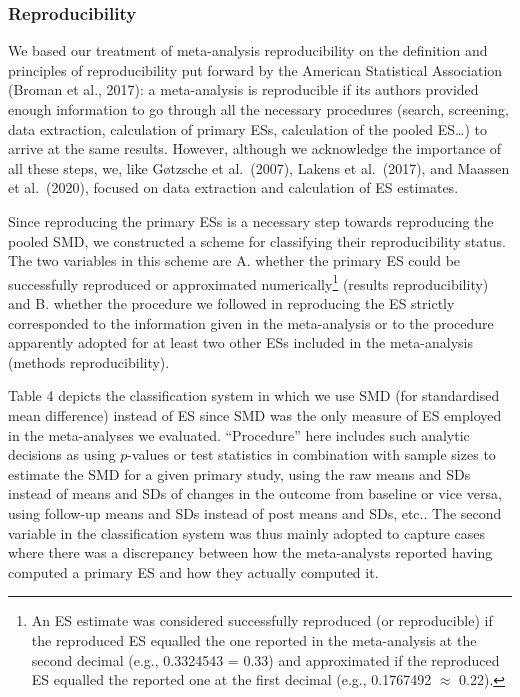 \documentclass[
  man,floatsintext]{apa6}
\begin{document}
\hypertarget{reproducibility-1}{%
\subsubsection{Reproducibility}\label{reproducibility-1}}

We based our treatment of meta-analysis reproducibility on the definition and principles of reproducibility put forward by the American Statistical Association (Broman et al., 2017): a meta-analysis is reproducible if its authors provided enough information to go through all the necessary procedures (search, screening, data extraction, calculation of primary ESs, calculation of the pooled ES\ldots) to arrive at the same results. However, although we acknowledge the importance of all these steps, we, like Gøtzsche et al.~(2007), Lakens et al.~(2017), and Maassen et al.~(2020), focused on data extraction and calculation of ES estimates.

Since reproducing the primary ESs is a necessary step towards reproducing the pooled SMD, we constructed a scheme for classifying their reproducibility status. The two variables in this scheme are A. whether the primary ES could be successfully reproduced or approximated numerically\footnote{An ES estimate was considered successfully reproduced (or reproducible) if the reproduced ES equalled the one reported in the meta-analysis at the second decimal (e.g., 0.3324543 = 0.33) and approximated if the reproduced ES equalled the reported one at the first decimal (e.g., 0.1767492 \(\approx\) 0.22).} (results reproducibility) and B. whether the procedure we followed in reproducing the ES strictly corresponded to the information given in the meta-analysis or to the procedure apparently adopted for at least two other ESs included in the meta-analysis (methods reproducibility).

Table 4 depicts the classification system in which we use SMD (for standardised mean difference) instead of ES since SMD was the only measure of ES employed in the meta-analyses we evaluated. ``Procedure'' here includes such analytic decisions as using \(p\)-values or test statistics in combination with sample sizes to estimate the SMD for a given primary study, using the raw means and SDs instead of means and SDs of changes in the outcome from baseline or vice versa, using follow-up means and SDs instead of post means and SDs, etc.. The second variable in the classification system was thus mainly adopted to capture cases where there was a discrepancy between how the meta-analysts reported having computed a primary ES and how they actually computed it.
\end{document}
